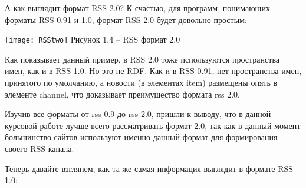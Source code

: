 \documentclass[14pt,a4paper]{extreport}
\begin{document}
\par\noindent
\flushleft\parindent=1cm А как выглядит формат RSS 2.0? К счастью, для программ, понимающих форматы RSS 0.91 и 1.0, формат RSS 2.0 будет довольно простым:\par
	\center \texttt{[image: RSStwo]}   
           \center Рисунок 1.4 – RSS формат 2.0\par
\flushleft\parindent=1cm Как показывает данный пример, в RSS 2.0 тоже используются пространства имен, как и в RSS 1.0. Но это не RDF. Как и в RSS 0.91, нет пространства имен, принятого по умолчанию, а новости (в элементах item) размещены опять в элементе channel, что доказывает преимущество формата rss 2.0.\par
Изучив все форматы от rss 0.9 до rss 2.0, пришли к выводу, что в данной курсовой работе лучше всего рассматривать формат 2.0, так как в данный момент большинство сайтов используют именно данный формат для формирования своего RSS канала.\par
Теперь давайте взглянем, как та же самая информация выглядит в формате RSS 1.0:\par
	
\end{document}
